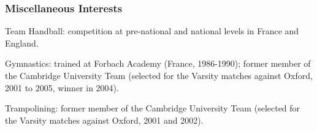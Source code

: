 \documentclass[11pt]{article}
\begin{document}
\subsubsection{Miscellaneous Interests} 
\bitemize
\item Team Handball: competition at pre-national and national levels in France and England.
\item Gymnastics:  trained at Forbach Academy (France, 1986-1990); former member of the Cambridge University Team (selected for the Varsity matches against Oxford, 2001 to 2005, winner in 2004).
\item Trampolining: former member of the Cambridge University Team (selected for the Varsity matches against Oxford, 2001 and 2002).
\eitemize

\end{document}
